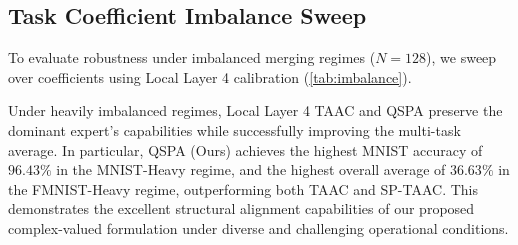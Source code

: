 \documentclass{article}
\begin{document}
\subsection{Task Coefficient Imbalance Sweep}
To evaluate robustness under imbalanced merging regimes ($N=128$), we sweep over coefficients using Local Layer 4 calibration (\cref{tab:imbalance}).

\begin{table}[h]
\caption{Local Layer 4 model merging accuracies (\%) under imbalanced merging regimes ($N=128$).}
\label{tab:imbalance}
\begin{center}
\begin{small}
\end{small}
\end{center}
\end{table}

Under heavily imbalanced regimes, Local Layer 4 TAAC and QSPA preserve the dominant expert's capabilities while successfully improving the multi-task average. In particular, QSPA (Ours) achieves the highest MNIST accuracy of \textbf{$96.43\%$} in the MNIST-Heavy regime, and the highest overall average of \textbf{$36.63\%$} in the FMNIST-Heavy regime, outperforming both TAAC and SP-TAAC. This demonstrates the excellent structural alignment capabilities of our proposed complex-valued formulation under diverse and challenging operational conditions.
\end{document}
